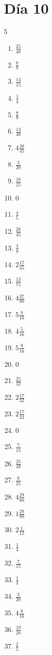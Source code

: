 \documentclass[12pt]{article}
\begin{document}
\section*{Día 10}
\begin{multicols}{5}\begin{enumerate}
\item $ \frac{25}{48} $
\item $ \frac{8}{9} $
\item $ \frac{14}{15} $
\item $ \frac{1}{4} $
\item $ \frac{8}{9} $
\item $ \frac{13}{48} $
\item $ 4 \frac{38}{45} $
\item $ \frac{3}{20} $
\item $ \frac{18}{25} $
\item $ 0 $
\item $ \frac{4}{5} $
\item $ \frac{28}{45} $
\item $ \frac{3}{8} $
\item $ 2 \frac{17}{45} $
\item $ \frac{13}{75} $
\item $ 4 \frac{37}{80} $
\item $ 5 \frac{9}{16} $
\item $ 4 \frac{5}{16} $
\item $ 5 \frac{9}{16} $
\item $ 0 $
\item $ \frac{25}{32} $
\item $ 2 \frac{17}{32} $
\item $ 2 \frac{17}{32} $
\item $ 0 $
\item $ \frac{7}{15} $
\item $ \frac{25}{48} $
\item $ \frac{8}{25} $
\item $ 4 \frac{29}{80} $
\item $ 1 \frac{29}{80} $
\item $ 2 \frac{1}{12} $
\item $ \frac{1}{4} $
\item $ \frac{7}{15} $
\item $ \frac{1}{4} $
\item $ \frac{3}{20} $
\item $ 4 \frac{9}{16} $
\item $ \frac{19}{20} $
\item $ \frac{2}{5} $

\end{enumerate}
\end{multicols}
\end{document}
